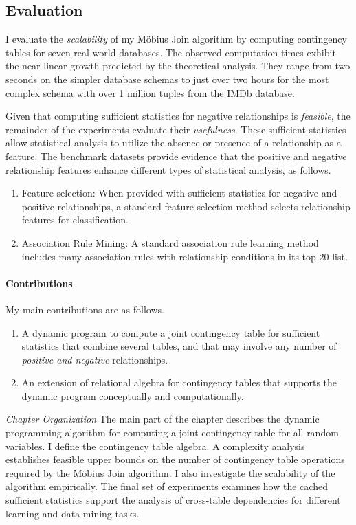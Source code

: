 \documentclass{sfuthesis}
\begin{document}
\subsection{Evaluation} I  evaluate the {\em scalability} of my M\"obius Join algorithm by computing contingency tables for seven real-world databases. The observed computation times exhibit the near-linear growth predicted by the theoretical analysis. They range from two seconds on the simpler database schemas to just over two hours for the most complex schema with over 1 million tuples from the IMDb database.

Given that computing sufficient statistics for negative relationships is {\em feasible}, the remainder of the experiments evaluate their {\em usefulness}. These sufficient statistics allow statistical analysis to utilize the absence or presence of a relationship as a feature. 
The benchmark datasets provide evidence that the positive and negative relationship features enhance different types of statistical analysis, as follows. 
\begin{enumerate}
\item Feature selection: When provided with sufficient statistics for negative and positive relationships, a standard feature selection method selects relationship features for classification.
\item Association Rule Mining: A standard association rule learning method includes many association rules with relationship conditions in its top 20 list. 
\end{enumerate}


\paragraph{ Contributions} My main contributions are as follows.
\begin{enumerate}
\item A dynamic program to compute a joint contingency table for sufficient statistics that combine several tables, and that may involve any number of {\em positive and negative }relationships.
\item An extension of relational algebra for contingency tables that supports the dynamic program conceptually and computationally.
\end{enumerate}


\emph{Chapter Organization} 
The main part of the chapter describes the dynamic programming algorithm for computing a joint contingency table for all random variables. I  define the contingency table algebra.  A complexity analysis establishes feasible upper bounds on the number of contingency table operations required by the M\"obius Join algorithm. I  also investigate the scalability of the algorithm empirically. The final set of experiments examines how the cached sufficient statistics support the analysis of cross-table dependencies for different learning and data mining tasks.
\end{document}
